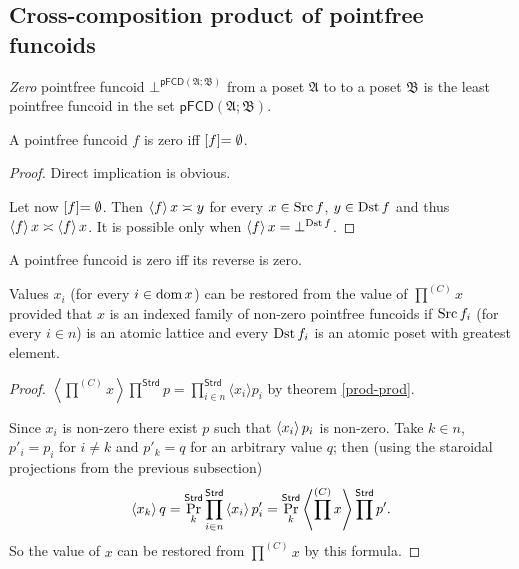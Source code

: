 \subsection{Cross-composition product of pointfree funcoids}
\begin{defn}
\emph{Zero} pointfree funcoid $\bot^{\mathsf{pFCD}(\mathfrak{A};\mathfrak{B})}$
from a poset $\mathfrak{A}$ to to a poset $\mathfrak{B}$ is the
least pointfree funcoid in the set $\mathsf{pFCD}(\mathfrak{A};\mathfrak{B})$.\end{defn}
\begin{prop}
A pointfree funcoid $f$ is zero iff $\mathrel{\left[f\right]}=\emptyset$.\end{prop}
\begin{proof}
Direct implication is obvious.

Let now $\mathrel{\left[f\right]}=\emptyset$. Then $\left\langle f\right\rangle x\asymp y$ for every
$x\in\operatorname{Src} f$, $y\in\operatorname{Dst} f$ and thus $\left\langle f\right\rangle x\asymp\left\langle f\right\rangle x$.
It is possible only when $\left\langle f\right\rangle x=\bot^{\operatorname{Dst} f}$.\end{proof}
\begin{cor}
A pointfree funcoid is zero iff its reverse is zero.\end{cor}
\begin{prop}
Values $x_{i}$ (for every $i\in\operatorname{dom} x$) can be restored from the
value of $\prod^{(C)}x$ provided that $x$ is an indexed family of
non-zero pointfree funcoids if $\operatorname{Src} f_{i}$ (for every $i\in n$)
is an atomic lattice and every $\operatorname{Dst} f_{i}$ is an atomic poset with
greatest element.\end{prop}
\begin{proof}
$\left\langle \prod^{(C)}x\right\rangle \prod^{\mathsf{Strd}}p=\prod_{i\in n}^{\mathsf{Strd}}\langle x_{i}\rangle p_{i}$
by theorem \ref{prod-prod}.

Since $x_{i}$ is non-zero there exist $p$ such that $\left\langle x_{i}\right\rangle p_{i}$
is non-zero. Take $k\in n$, $p'_{i}=p_{i}$ for $i\neq k$ and $p'_{k}=q$
for an arbitrary value $q$; then (using the staroidal projections
from the previous subsection) 
\[
\left\langle x_{k}\right\rangle q=\Pr_{k}^{\mathsf{Strd}}\prod_{i\in n}^{\mathsf{Strd}}\left\langle x_{i}\right\rangle p'_{i}=\Pr_{k}^{\mathsf{Strd}}\left\langle \prod^{(C)}x\right\rangle\prod^{\mathsf{Strd}}p'.
\]
So the value of $x$ can be restored from $\prod^{(C)}x$ by this
formula.
\end{proof}

